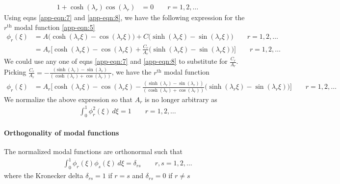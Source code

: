 \documentclass[12pt]{report}
\begin{document}
\begin{align*}
 1 + \cosh(\lambda_r)\cos(\lambda_r) &= 0 \qquad r = 1, 2, \dots
\end{align*}
Using eqns \ref{app-eqn:7} and \ref{app-eqn:8}, we have the following expression for the $r^{\text{th}}$ modal function \ref{app-eqn:5}
\begin{align*}
\phi_r(\xi) &= A \bigg(\cosh (\lambda_r \xi) - \cos (\lambda_r \xi)\bigg) + C\bigg(\sinh(\lambda_r \xi) - \sin(\lambda_r \xi) \bigg) \qquad r = 1, 2, \dots \\
       &= A_r \bigg[\cosh (\lambda_r \xi) - \cos (\lambda_r \xi) + \frac{C_r}{A_r}\bigg(\sinh(\lambda_r \xi) - \sin(\lambda_r \xi) \bigg)\bigg] \qquad r = 1, 2, \dots
\end{align*}
We could use any one of eqns \ref{app-eqn:7} and \ref{app-eqn:8} to substitute for $\frac{C_r}{A_r}$. Picking $\frac{C_r}{A_r} = -\frac{(\sinh (\lambda_r) - \sin (\lambda_r)}{(\cosh (\lambda_r) + \cos (\lambda_r))} $, we have the $r^{\text{th}}$ modal function
\begin{align}
\phi_r(\xi) &= A_r \bigg[\cosh (\lambda_r \xi) - \cos (\lambda_r \xi) -\frac{(\sinh (\lambda_r) - \sin (\lambda_r))}{(\cosh (\lambda_r) + \cos (\lambda_r))}\bigg(\sinh(\lambda_r \xi) - \sin(\lambda_r \xi) \bigg)\bigg] \qquad r = 1, 2, \dots \label{app-bin:modal-function}
\end{align}
We normalize the above expression so that  $A_r$ is no longer arbitrary as
\begin{align*}
  \int_{0}^1 \phi_r^2 (\xi) ~d\xi = 1 \qquad r = 1, 2, \dots
\end{align*}
\paragraph{Orthogonality of modal functions} The normalized modal functions are orthonormal such that
\begin{align*}
       \int_{0}^1 \phi_r (\xi) \phi_s (\xi) ~d\xi = \delta_{rs} \qquad r, s = 1, 2, \dots
\end{align*}
where the Kronecker delta $\delta_{rs} = 1$ if $r = s$ and $\delta_{rs} = 0$ if $r \neq s$
\end{document}
